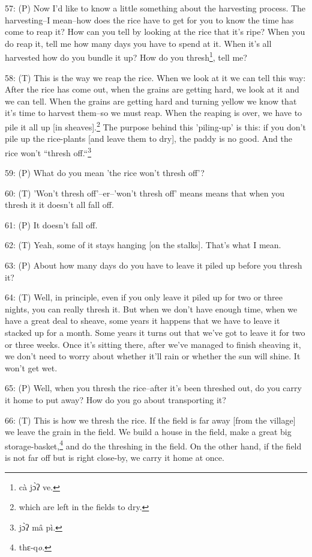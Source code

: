 57: (P) Now I'd like to know a little something about the harvesting process. The
harvesting--I mean--how does the rice have to get for you to know the time has
come to reap it? How can you tell by looking at the rice that it's ripe? When you
do reap it, tell me how many days you have to spend at it. When it's all harvested
how do you bundle it up? How do you thresh\footnote{cà jɔ̀ʔ ve.}, tell me?

58: (T) This is the way we reap the rice. When we look at it we can tell this way:
After the rice has come out, when the grains are getting hard, we look at it and
we can tell. When the grains are getting hard and turning yellow we know that it's
time to harvest them--so we must reap. When the reaping is over, we have to pile
it all up [in sheaves].\footnote{which are left in the fields to dry.} The purpose behind this 'piling-up' is this: if you
don't pile up the rice-plants [and leave them to dry], the paddy is no good. And
the rice won't ``thresh off.``\footnote{jɔ̀ʔ mâ pì.}

59: (P) What do you mean 'the rice won't thresh off'?

60: (T) 'Won't thresh off'--er--'won't thresh off' means means that when you thresh
it it doesn't all fall off.

61: (P) It doesn't fall off.

62: (T) Yeah, some of it stays hanging [on the stalks]. That's what I mean.

63: (P) About how many days do you have to leave it piled up before you thresh
it?

64: (T) Well, in principle, even if you only leave it piled up for two or three
nights, you can really thresh it. But when we don't have enough time, when we have
a great deal to sheave, some years it happens that we have to leave it stacked
up for a month. Some years it turns out that we've got to leave it for two or three
weeks. Once it's sitting there, after we've managed to finish sheaving it, we don't
need to worry about whether it'll rain or whether the sun will shine. It won't
get wet.

65: (P) Well, when you thresh the rice--after it's been threshed out, do you carry
it home to put away? How do you go about transporting it?

66: (T) This is how we thresh the rice. If the field is far away [from the village]
we leave the grain in the field. We build a house in the field, make a great big
storage-basket,\footnote{thɛ-q\emph{o}.} and do the threshing in the field. On the other hand, if the
field is not far off but is right close-by, we carry it home at once.

